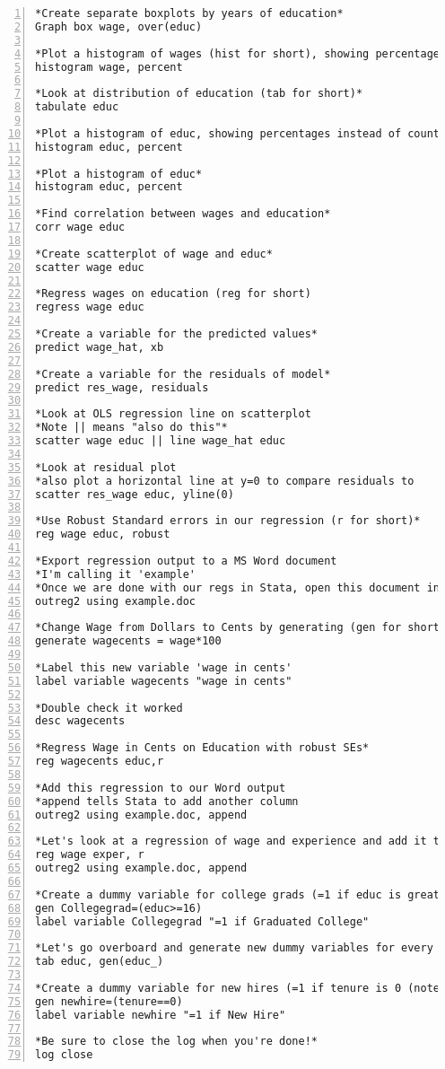 \documentclass{article}
\begin{document}
\begin{Verbatim}[frame=single, numbers=left, numbersep=2pt]
*Create separate boxplots by years of education*
Graph box wage, over(educ)

*Plot a histogram of wages (hist for short), showing percentages instead of counts*
histogram wage, percent

*Look at distribution of education (tab for short)*
tabulate educ

*Plot a histogram of educ, showing percentages instead of counts*
histogram educ, percent

*Plot a histogram of educ*
histogram educ, percent

*Find correlation between wages and education*
corr wage educ

*Create scatterplot of wage and educ*
scatter wage educ

*Regress wages on education (reg for short)
regress wage educ

*Create a variable for the predicted values*
predict wage_hat, xb

*Create a variable for the residuals of model*
predict res_wage, residuals

*Look at OLS regression line on scatterplot
*Note || means "also do this"*
scatter wage educ || line wage_hat educ

*Look at residual plot
*also plot a horizontal line at y=0 to compare residuals to
scatter res_wage educ, yline(0)

*Use Robust Standard errors in our regression (r for short)*
reg wage educ, robust

*Export regression output to a MS Word document
*I'm calling it 'example'
*Once we are done with our regs in Stata, open this document in MS Word*
outreg2 using example.doc

*Change Wage from Dollars to Cents by generating (gen for short) a new variable*
generate wagecents = wage*100

*Label this new variable 'wage in cents'
label variable wagecents "wage in cents"

*Double check it worked
desc wagecents

*Regress Wage in Cents on Education with robust SEs*
reg wagecents educ,r 

*Add this regression to our Word output
*append tells Stata to add another column 
outreg2 using example.doc, append

*Let's look at a regression of wage and experience and add it to our regression output
reg wage exper, r
outreg2 using example.doc, append

*Create a dummy variable for college grads (=1 if educ is greater than or equal to 16, else=0)
gen Collegegrad=(educ>=16)
label variable Collegegrad "=1 if Graduated College"

*Let's go overboard and generate new dummy variables for every level of schooling*
tab educ, gen(educ_)

*Create a dummy variable for new hires (=1 if tenure is 0 (note the double ==!, else=0)*
gen newhire=(tenure==0)
label variable newhire "=1 if New Hire"

*Be sure to close the log when you're done!* 
log close
\end{Verbatim}
\end{document}

